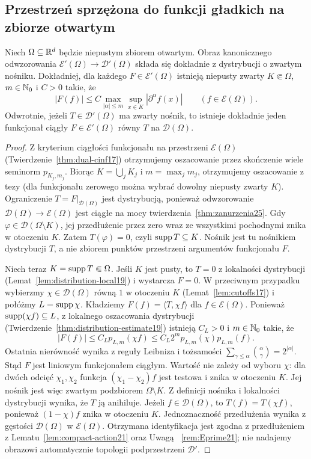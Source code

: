 \subsection{Przestrzeń sprzężona do funkcji gładkich na zbiorze otwartym}
\begin{twierdzenie}
\label{thm:compact-support-E25}
Niech $\Omega\subseteq\mathbb R^d$ będzie niepustym zbiorem otwartym.
Obraz kanonicznego odwzorowania
$\mathcal E'(\Omega)\to\mathcal D'(\Omega)$
składa się dokładnie z dystrybucji o zwartym nośniku.
Dokładniej, dla każdego $F\in\mathcal E'(\Omega)$ istnieją
niepusty zwarty $K\Subset\Omega$, $m\in\mathbb N_0$ i $C>0$ takie, że
\[
 |F(f)|\le C\max_{|\alpha|\le m}\sup_{x\in K}
 |\partial^\alpha f(x)|\qquad(f\in\mathcal E(\Omega)).
\]
Odwrotnie, jeżeli $T\in\mathcal D'(\Omega)$ ma zwarty nośnik,
to istnieje dokładnie jeden funkcjonał ciągły
$F\in\mathcal E'(\Omega)$ równy $T$ na $\mathcal D(\Omega)$.
\end{twierdzenie}
\begin{proof}
Z kryterium ciągłości funkcjonału na przestrzeni
$\mathcal E(\Omega)$ (Twierdzenie~\ref{thm:dual-cinf17})
otrzymujemy oszacowanie przez skończenie wiele
seminorm $p_{K_j,m_j}$. Biorąc $K=\bigcup_jK_j$
i $m=\max_jm_j$, otrzymujemy oszacowanie z tezy
(dla funkcjonału zerowego można wybrać dowolny
niepusty zwarty $K$). Ograniczenie
$T=F|_{\mathcal D(\Omega)}$ jest dystrybucją, ponieważ
odwzorowanie $\mathcal D(\Omega)\to\mathcal E(\Omega)$
jest ciągłe na mocy twierdzenia~\ref{thm:zanurzenia25}. Gdy
$\varphi\in\mathcal D(\Omega\setminus K)$, jej
przedłużenie przez zero wraz ze wszystkimi pochodnymi
znika w otoczeniu $K$. Zatem $T(\varphi)=0$,
czyli $\operatorname{supp} T\subseteq K$.
Nośnik jest tu nośnikiem dystrybucji $T$,
a nie zbiorem punktów przestrzeni argumentów funkcjonału $F$.

Niech teraz $K=\operatorname{supp} T\Subset\Omega$. Jeśli $K$ jest
pusty, to $T=0$ z lokalności dystrybucji
(Lemat~\ref{lem:distribution-local19}) i wystarcza $F=0$.
W przeciwnym przypadku wybierzmy
$\chi\in\mathcal D(\Omega)$ równą $1$ w otoczeniu $K$
(Lemat~\ref{lem:cutoffs17}) i połóżmy $L=\operatorname{supp}\chi$.
Kładziemy $F(f)=\langle T,\chi f\rangle$ dla
$f\in\mathcal E(\Omega)$. Ponieważ $\operatorname{supp}(\chi f)\subseteq L$,
z lokalnego oszacowania dystrybucji
(Twierdzenie~\ref{thm:distribution-estimate19})
istnieją $C_L>0$ i $m\in\mathbb N_0$ takie, że
\[
 |F(f)|\le C_L p_{L,m}(\chi f)
 \le C_L 2^m p_{L,m}(\chi)p_{L,m}(f).
\]
Ostatnia nierówność wynika z reguły Leibniza i tożsamości
$\sum_{\gamma\le\alpha}\binom{\alpha}{\gamma}=2^{|\alpha|}$.
Stąd $F$ jest liniowym funkcjonałem ciągłym.
Wartość nie zależy od wyboru $\chi$: dla dwóch odcięć
$\chi_1,\chi_2$ funkcja $(\chi_1-\chi_2)f$ jest testowa
i znika w otoczeniu $K$. Jej nośnik jest więc zwartym
podzbiorem $\Omega\setminus K$. Z definicji nośnika
i lokalności dystrybucji wynika, że $T$ ją anihiluje. Jeżeli $f\in\mathcal D(\Omega)$, to
$T(f)=T(\chi f)$, ponieważ $(1-\chi)f$ znika w
otoczeniu $K$. Jednoznaczność przedłużenia wynika
z gęstości $\mathcal D(\Omega)$ w $\mathcal E(\Omega)$.
Otrzymana identyfikacja jest zgodna z przedłużeniem
z Lematu~\ref{lem:compact-action21} oraz Uwagą~
\ref{rem:Eprime21}; nie nadajemy obrazowi automatycznie
topologii podprzestrzeni $\mathcal D'$.
\end{proof}
